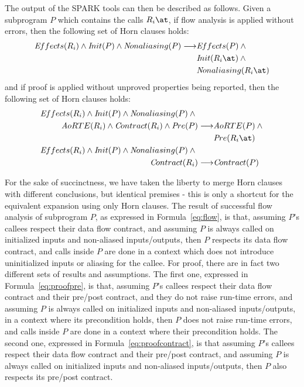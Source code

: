 \documentclass{llncs}
\newcommand{\spark}{SPARK\xspace}
\begin{document}
The output of the \spark tools can then be described as follows. Given a
subprogram $P$ which contains the calls $R_i\at$, if flow
analysis is applied without errors, then the following set of Horn clauses holds:
\begin{align}
   {\textit Effects}(R_i) \wedge {\textit Init}(P) \wedge {}
   {\textit Nonaliasing}(P) \longrightarrow &{\textit Effects}(P) \wedge {} \nonumber \\
   & {\textit Init}(R_i\at) \wedge {} \nonumber \\
   & {\textit Nonaliasing}(R_i\at)
\label{eq:flow}
\end{align}
and if proof is applied without unproved properties being reported,
then the following set of Horn clauses holds:
\begin{align}
   {\textit Effects}(R_i) \wedge {\textit Init}(P) \wedge {}
   {\textit Nonaliasing}(P) \wedge {} \qquad {} & \nonumber \\
   {\textit AoRTE}(R_i) \wedge {\textit Contract}(R_i)
   \wedge {\textit Pre}(P) \longrightarrow &
   {\textit AoRTE}(P) \wedge {} \nonumber \\
\label{eq:proofpre}
   & {\textit Pre}(R_i\at) \\
   {\textit Effects}(R_i) \wedge {\textit Init}(P) \wedge {}
   {\textit Nonaliasing}(P) \wedge {} \qquad {} & \nonumber \\
   {\textit Contract}(R_i) \longrightarrow & {\textit Contract}(P)
\label{eq:proofcontract}
\end{align}

For the sake of succinctness, we have taken the liberty to merge Horn clauses
with different conclusions, but identical premises - this is only a shortcut
for the equivalent expansion using only Horn clauses.  The result of
successful flow analysis of subprogram $P$, as expressed in
Formula~\ref{eq:flow}, is that, assuming $P$'s callees respect their data flow
contract, and assuming $P$ is always called on initialized inputs and
non-aliased inputs/outputs, then $P$ respects its data flow contract, and
calls inside $P$ are done in a context which does not introduce uninitialized
inputs or aliasing for the callee. For proof, there are in fact two different
sets of results and assumptions. The first one, expressed in
Formula~\ref{eq:proofpre}, is that, assuming $P$'s callees respect their data
flow contract and their pre/post contract, and they do not raise run-time
errors, and assuming $P$ is always called on initialized inputs and
non-aliased inputs/outputs, in a context where its precondition holds, then
$P$ does not raise run-time errors, and calls inside $P$ are done in a context
where their precondition holds. The second one, expressed in
Formula~\ref{eq:proofcontract}, is that assuming $P$'s callees respect their
data flow contract and their pre/post contract, and assuming $P$ is always
called on initialized inputs and non-aliased inputs/outputs, then $P$ also
respects its pre/post contract.
\end{document}
